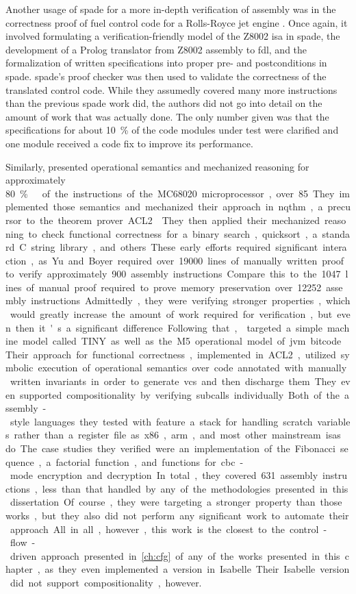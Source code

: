 Another usage of \ac{spade} for a more in-depth verification of assembly
was in the correctness proof of fuel control code for a Rolls-Royce
jet engine \autocite{oneill1988verification}. Once again,
it involved formulating a verification-friendly model of the Z8002 \ac{isa}
in \ac{spade}, the development of a Prolog translator from Z8002 assembly to \ac{fdl},
and the formalization of written specifications into proper pre- and postconditions
in \ac{spade}. \Ac{spade}'s proof checker was then used to validate the correctness
of the translated control code. While they assumedly covered many more instructions
than the previous \ac{spade} work did, the authors did not go into detail
on the amount of work that was actually done.
The only number given was that the specifications for about \SI{10}{\percent}
of the code modules under test were clarified
and one module received a code fix to improve its performance.

Similarly, \textcite{yu1993automated,boyer1996automated}
presented operational semantics and mechanized reasoning
for approximately \SI{80}\percent\ of the instructions of the MC68020 microprocessor, over \num{85}.
They implemented those semantics and mechanized their approach
in \ac{nqthm}, a precursor to the theorem prover ACL2 \autocite{ACL2}.
They then applied their mechanized reasoning to check functional correctness
for a binary search, quicksort, a standard C string library, and others.
These early efforts required significant interaction,
as Yu and Boyer required over \num{19000}
lines of manually written proof to verify approximately \num{900} assembly instructions.
Compare this to the \num{1047} lines of manual proof
required to prove memory preservation over \num{12252} assembly instructions.
Admittedly, they were verifying stronger properties,
which would greatly increase the amount of work required for verification,
but even then it's a significant difference.

Following that, \textcite{matthews2006verification}
targeted a simple machine model called TINY
as well as the M5 operational model of \ac{jvm} bitcode.
Their approach for functional correctness, implemented in ACL2,
utilized symbolic execution of operational semantics
over code annotated with manually written invariants
in order to generate \acp{vc} and then discharge them.
They even supported compositionality by verifying subcalls individually.
Both of the assembly-style languages they tested with feature a stack
for handling scratch variables rather than a register file
as \gls{x86}, \gls{arm}, and most other mainstream \acp{isa} do.
The case studies they verified were an implementation of the Fibonacci sequence,
a factorial function, and functions for \ac{cbc}-mode encryption and decryption.
In total, they covered \num{631} assembly instructions,
less than that handled by any of the methodologies presented in this dissertation.
Of course, they were targeting a stronger property than those works,
but they also did not perform any significant work to automate their approach.
All in all, however, this work is the closest to the control-flow-driven approach
presented in \cref{ch:cfg} of any of the works presented in this chapter,
as they even implemented a version in Isabelle. Their Isabelle version did not support
compositionality, however.

